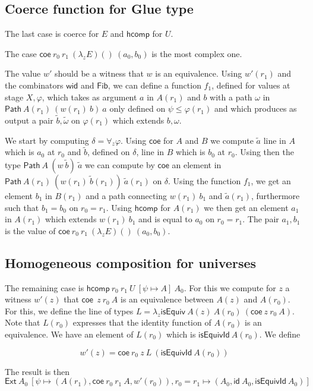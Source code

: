 \documentclass[10pt,a4paper]{article}
\newcommand{\id}{\mathsf{id}}
\newcommand{\Fib}{\mathsf{Fib}}
\newcommand{\isEquiv}{\mathsf{isEquiv}}
\newcommand{\isEquivId}{\mathsf{isEquivId}}
\newcommand{\Path}{\mathsf{Path}}
\newcommand{\Ext}{\mathsf{Ext}}
\newcommand{\wid}{\mathsf{wid}}
\newcommand{\hcomp}{\mathsf{hcomp}}
\newcommand{\coe}{\mathsf{coe}}
\begin{document}
\subsection*{Coerce function for Glue type}

The last case is coerce for $E$ and $\hcomp$ for $U$.

The case $\coe~r_0~r_1~(\lambda_z E)()~(a_0,b_0)$ is the most complex one.

The value $w'$ should be a witness that $w$ is an equivalence. Using $w'(r_1)$ and the combinators
$\wid$ and $\Fib$, we can define a function $f_1$, defined for values at stage $X,\varphi$,
which takes as argument $a$ in $A(r_1)$ and $b$ with a path $\omega$ in $\Path~A(r_1)~(w(r_1)~b)~a$
only defined on $\psi\leqslant \varphi(r_1)$
and which produces as output a pair $\tilde{b},\tilde{\omega}$ on $\varphi(r_1)$
which extends $b,\omega$.

We start by computing $\delta = \forall_z\varphi$. Using $\coe$ for $A$ and $B$ we compute
$\tilde{a}$ line in $A$ which is $a_0$ at $r_0$ and $\tilde{b}$, defined on $\delta$, line in $B$
which is $b_0$ at $r_0$. Using then the type $\Path~A~(w~\tilde{b})~\tilde{a}$ we can compute
by $\coe$ an element in $\Path~A(r_1)~(w(r_1)~\tilde{b}(r_1))~\tilde{a}(r_1)$ on $\delta$.
Using the function $f_1$, we get an element $b_1$ in $B(r_1)$ and a path connecting $w(r_1)~b_1$ and
$\tilde{a}(r_1)$, furthermore such that $b_1 = b_0$ on $r_0=r_1$.
Using $\hcomp$ for $A(r_1)$ we then get an element $a_1$ in $A(r_1)$ which
extends $w(r_1)~b_1$ and is equal to $a_0$ on $r_0=r_1$. The pair $a_1,b_1$ is the value of
$\coe~r_0~r_1~(\lambda_z E)()~(a_0,b_0)$.

\subsection*{Homogeneous composition for universes}

The remaining case is $\hcomp~r_0~r_1~U~[\psi\mapsto A]~A_0$. For this we compute for $z$
a witness $w'(z)$ that $\coe~~z~r_0~A$ is an equivalence between $A(z)$ and $A(r_0)$.
For this, we define the line of types $L = \lambda_z\isEquiv~A(z)~A(r_0)~(\coe~z~r_0~A)$.
Note that $L(r_0)$ expresses that the identity function of $A(r_0)$ is an equivalence.
We have an element of $L(r_0)$ which is $\isEquivId~A(r_0)$. We define

$$
w'(z) = \coe~r_0~z~L~(\isEquivId~A(r_0))
$$

The result is then
$\Ext~A_0~[\psi\mapsto (A(r_1),\coe~r_0~r_1~A,w'(r_0)),r_0=r_1\mapsto (A_0,\id~{A_0},\isEquivId~A_0)]$
\end{document}
